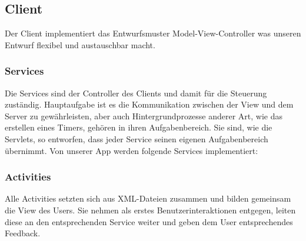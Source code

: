 	\subsection{Client}
	Der Client implementiert das Entwurfsmuster Model-View-Controller was unseren Entwurf flexibel und austauschbar macht.
	\subsubsection{Services}
	Die Services sind der Controller des Clients und damit für die Steuerung zuständig. Hauptaufgabe ist es die Kommunikation zwischen der View und dem Server zu gewährleisten, aber auch Hintergrundprozesse anderer Art, wie das erstellen eines Timers, gehören in ihren Aufgabenbereich.
Sie sind, wie die Servlets, so entworfen, dass jeder Service seinen eigenen Aufgabenbereich übernimmt.
Von unserer App werden folgende Services implementiert:
\newline

\begin {center}
\end {center}

	\subsubsection{Activities}
	Alle Activities setzten sich aus XML-Dateien zusammen und bilden gemeinsam die View des Users.
Sie nehmen als erstes Benutzerinteraktionen entgegen, leiten diese an den entsprechenden Service weiter und geben dem User entsprechendes Feedback.
	\newline

